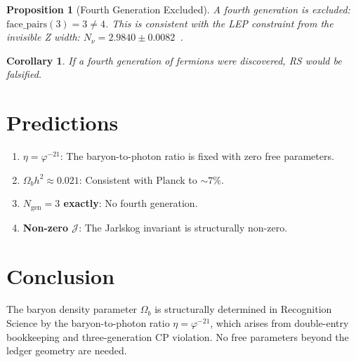 \documentclass[12pt,a4paper]{article}
\newtheorem{corollary}[theorem]{Corollary}
\newtheorem{proposition}[theorem]{Proposition}
\theoremstyle{definition}
\theoremstyle{remark}
\begin{document}
\begin{proposition}[Fourth Generation Excluded]
A fourth generation is excluded:
$\mathrm{face\_pairs}(3) = 3 \neq 4$.  This is consistent with
the LEP constraint from the invisible Z width:
$N_\nu = 2.9840 \pm 0.0082$~\cite{LEP2006}.
\end{proposition}

\begin{corollary}
If a fourth generation of fermions were discovered, RS would be
falsified.
\end{corollary}

\section{Predictions}
\label{sec:predictions}

\begin{enumerate}
  \item \textbf{$\eta = \varphi^{-21}$}: The baryon-to-photon
  ratio is fixed with zero free parameters.

  \item \textbf{$\Omega_b h^2 \approx 0.021$}: Consistent with
  Planck to $\sim 7\%$.

  \item \textbf{$N_{\mathrm{gen}} = 3$ exactly}: No fourth
  generation.

  \item \textbf{Non-zero $\mathcal{J}$}: The Jarlskog invariant
  is structurally non-zero.
\end{enumerate}

\section{Conclusion}
\label{sec:conclusion}

The baryon density parameter $\Omega_b$ is structurally determined
in Recognition Science by the baryon-to-photon ratio
$\eta = \varphi^{-21}$, which arises from double-entry bookkeeping
and three-generation CP violation.  No free parameters beyond the
ledger geometry are needed.
\end{document}
